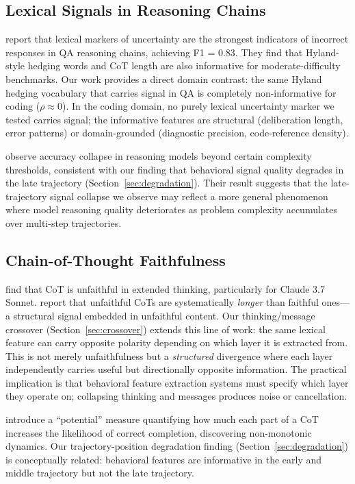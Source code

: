 \documentclass[11pt]{article}
\begin{document}
\subsection{Lexical Signals in Reasoning Chains}

\citet{vanhoyweghen2025lexical} report that lexical markers of uncertainty are the strongest indicators of incorrect responses in QA reasoning chains, achieving F1 = 0.83.
They find that Hyland-style hedging words and CoT length are also informative for moderate-difficulty benchmarks.
Our work provides a direct domain contrast: the same Hyland hedging vocabulary that carries signal in QA is completely non-informative for coding ($\rho \approx 0$).
In the coding domain, no purely lexical uncertainty marker we tested carries signal; the informative features are structural (deliberation length, error patterns) or domain-grounded (diagnostic precision, code-reference density).

\citet{shojaee2025illusion} observe accuracy collapse in reasoning models beyond certain complexity thresholds, consistent with our finding that behavioral signal quality degrades in the late trajectory (Section~\ref{sec:degradation}).
Their result suggests that the late-trajectory signal collapse we observe may reflect a more general phenomenon where model reasoning quality deteriorates as problem complexity accumulates over multi-step trajectories.

\subsection{Chain-of-Thought Faithfulness}

\citet{arcuschin2025cot} find that CoT is unfaithful in extended thinking, particularly for Claude 3.7 Sonnet.
\citet{chen2025unfaithful} report that unfaithful CoTs are systematically \emph{longer} than faithful ones---a structural signal embedded in unfaithful content.
Our thinking/message crossover (Section~\ref{sec:crossover}) extends this line of work: the same lexical feature can carry opposite polarity depending on which layer it is extracted from.
This is not merely unfaithfulness but a \emph{structured} divergence where each layer independently carries useful but directionally opposite information.
The practical implication is that behavioral feature extraction systems must specify which layer they operate on; collapsing thinking and messages produces noise or cancellation.

\citet{bachmann2026potential} introduce a ``potential'' measure quantifying how much each part of a CoT increases the likelihood of correct completion, discovering non-monotonic dynamics.
Our trajectory-position degradation finding (Section~\ref{sec:degradation}) is conceptually related: behavioral features are informative in the early and middle trajectory but not the late trajectory.
\end{document}
